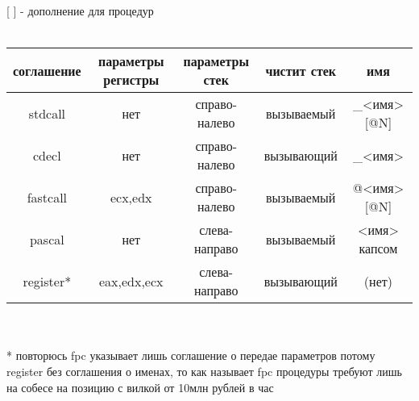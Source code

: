 \documentclass[a4paper,10pt]{article}
\begin{document}
[ ] - дополнение для процедур \\ \\
\begin{tabular}{|c|c|c|c|c|}
    \hline
    соглашение & параметры регистры & параметры стек & чистит стек & имя \\
    \hline
    stdcall & нет & справо-налево & вызываемый & \_<имя>[@N] \\
    \hline
    cdecl & нет & справо-налево & вызывающий & \_<имя> \\
    \hline
    fastcall & ecx,edx & справо-налево & вызываемый & @<имя>[@N] \\
    \hline
    pascal & нет & слева-направо & вызываемый & <имя> капсом \\
    \hline
    register* & eax,edx,ecx  & слева-направо & вызывающий & (нет) \\
    \hline
\end{tabular} \\ \\
* повторюсь fpc указывает лишь соглашение о передае параметров потому register без соглашения о именах, то как называет fpc процедуры требуют лишь на собесе на позицию с вилкой от 10млн рублей в час
\end{document}
